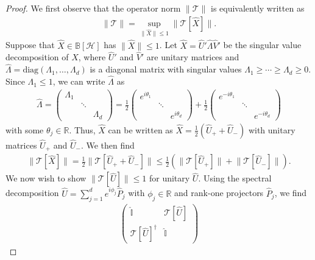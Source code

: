\documentclass[10pt,a4paper]{amsart}
\newcommand{\mbb}[1]{\mathbb{#1}}
\newcommand{\mc}[1]{\mathcal{#1}}
\begin{document}
\begin{proof}
We first observe that the operator norm $\lVert \mc{T} \rVert$ is equivalently written as 
\begin{align}
\lVert \mc{T} \rVert = \sup_{\lVert \hat{X} \rVert \leq 1} \lVert \mc{T}[\hat{X}] \rVert.
\end{align}
Suppose that $\hat{X} \in \mbb{B}[\mc{H}]$ has $\lVert \hat{X} \rVert \leq 1$.
Let $\hat{X} = \hat{U}' \hat{\Lambda} \hat{V}'$ be the singular value decomposition of $\hat{X}$, where $\hat{U}'$ and $\hat{V}'$ are unitary matrices and $\hat{\Lambda} = \mathrm{diag}(\Lambda_1, \ldots, \Lambda_d)$ is a diagonal matrix with singular values $\Lambda_1 \geq \cdots \geq \Lambda_d \geq 0$.
Since $\Lambda_1 \leq 1$, we can write $\hat{\Lambda}$ as 
\begin{align}
\hat{\Lambda} 
= \begin{pmatrix} \Lambda_1 && \\ & \ddots & \\ && \Lambda_d \end{pmatrix}
= \frac{1}{2} \begin{pmatrix} e^{i\theta_1} && \\ & \ddots & \\ && e^{i\theta_d} \end{pmatrix} + \frac{1}{2} \begin{pmatrix} e^{-i\theta_1} && \\ & \ddots & \\ && e^{-i\theta_d} \end{pmatrix}
\end{align}
with some $\theta_j \in \mbb{R}$. 
Thus, $\hat{X}$ can be written as $\hat{X} = \frac{1}{2}(\hat{U}_+ + \hat{U}_-)$ with unitary matrices $\hat{U}_+$ and $\hat{U}_-$.
We then find
\begin{align}
\lVert \mc{T}[\hat{X}] \rVert 
= \frac{1}{2} \lVert \mc{T}[\hat{U}_+ + \hat{U}_-] \rVert 
\leq \frac{1}{2} \left( \lVert \mc{T}[\hat{U}_+] \rVert + \lVert \mc{T} [\hat{U}_-] \rVert \right).
\end{align}
We now wish to show $\lVert \mc{T}[\hat{U}] \rVert \leq 1$ for unitary $\hat{U}$.
Using the spectral decomposition $\hat{U} = \sum_{j=1}^d e^{i\phi_j} \hat{P}_j$ with $\phi_j \in \mbb{R}$ and rank-one projectors $\hat{P}_j$, we find
\begin{align}
\begin{pmatrix} \hat{\mbb{I}} & \mc{T}[\hat{U}] \\ \mc{T}[\hat{U}]^\dagger & \hat{\mbb{I}} \end{pmatrix}

\end{align}
\end{proof}
\end{document}
